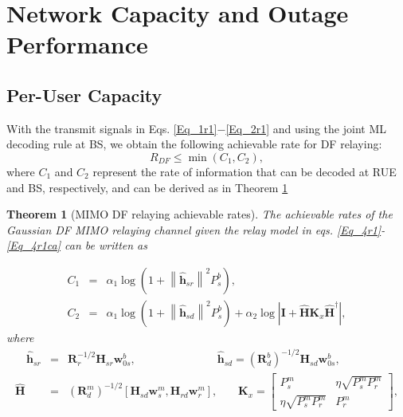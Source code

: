 \documentclass[12pt, draftclsnofoot, onecolumn]{IEEEtran}
\newtheorem{Theorem}{Theorem}
\theoremstyle{plain}
\newcommand{\norm}[1]{\left\lVert#1\right\rVert}
\begin{document}
\section{Network Capacity and Outage Performance}\label{Outage}
\subsection{Per-User Capacity}
With the transmit signals in Eqs. \eqref{Eq_1r1}$-$\eqref{Eq_2r1} and using the joint ML decoding rule {at BS}, we obtain the following achievable rate for DF relaying: %
\begin{equation}\label{maxmincut}
R_{DF}\leq \min (C_1, C_2),
\end{equation}
where $C_1$ and $C_2$ represent the rate of information that can be decoded at RUE and BS, respectively, and can be derived as in Theorem \ref{Theo2}
\begin{Theorem}[MIMO DF relaying achievable rates]\label{Theo2}
The achievable rates of the Gaussian DF MIMO relaying channel given the relay model in eqs. \eqref{Eq_4r1}-\eqref{Eq_4r1ca} can be written as
\end{Theorem}
\vspace{-.25in}
\begin{eqnarray} \label{eqRateRegion}
\!\!\!\!\!\!\!\!C_1&\!\!\!\!=\!\!\!\!&\alpha_1 \log{\left( 1+\norm{\mathbf{\hat{h}}_{sr}^{}}^2 P_{s}^b \right)},\nonumber\\%
%
%
\!\!\!\!\!\!\!\!C_2&\!\!\!\!=\!\!\!\!& \alpha_1 \log{\left( 1+\norm{\mathbf{\hat{h}}_{sd}^{}}^2 P_{s}^b \right)}%
%
+\alpha_2 \log{\left| \mathbf{I} +\mathbf{\hat{H}} \textbf{K}_x \mathbf{\hat{H}}^\dag\right|},
\end{eqnarray}
\textit{where}
\begin{eqnarray}\label{Channels2}
\!\!\!\!\!\!\!\!\!\!\!\!\!\!\!\quad{\mathbf{\hat{h}}_{sr}^{}}&\!\!\!\!\!=\!\!\!\!\!&{\textbf{R}_r^{-1/2} \textbf{H}_{sr}^{} \textbf{w}_{0s}^b},\quad\quad\quad\quad\quad\quad\quad\;
{\mathbf{\hat{h}}_{sd}^{}}={\left(\textbf{R}_{d}^b\right)^{-1/2} \textbf{H}_{sd}^{} \textbf{w}_{0s}^b},\nonumber\\
%
{\mathbf{\hat{H}}_{}^{}}&\!\!\!\!\!=\!\!\!\!\!&{\left(\textbf{R}_{d}^m\right)^{-1/2} \left[\textbf{H}_{sd}^{} \textbf{w}_{s}^m, \textbf{H}_{rd}^{} \textbf{w}_{r}^m \right] },\quad
%
\;\;\;{\textbf{K}_x}=\left[ \begin{array}{ll}
         P_s^m & \eta \sqrt{P_s^m P_r^m}\\
        \eta \sqrt{P_s^m P_r^m} & P_r^m\end{array} \right],
\end{eqnarray} 
\end{document}
